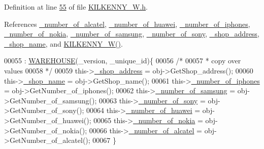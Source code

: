 Definition at line \hyperlink{_k_i_l_k_e_n_n_y___w_8h_source_l00055}{55} of file \hyperlink{_k_i_l_k_e_n_n_y___w_8h_source}{K\+I\+L\+K\+E\+N\+N\+Y\+\_\+\+W.\+h}.



References \hyperlink{_k_i_l_k_e_n_n_y___w_8h_source_l00116}{\+\_\+number\+\_\+of\+\_\+alcatel}, \hyperlink{_k_i_l_k_e_n_n_y___w_8h_source_l00114}{\+\_\+number\+\_\+of\+\_\+huawei}, \hyperlink{_k_i_l_k_e_n_n_y___w_8h_source_l00111}{\+\_\+number\+\_\+of\+\_\+iphones}, \hyperlink{_k_i_l_k_e_n_n_y___w_8h_source_l00115}{\+\_\+number\+\_\+of\+\_\+nokia}, \hyperlink{_k_i_l_k_e_n_n_y___w_8h_source_l00112}{\+\_\+number\+\_\+of\+\_\+samsung}, \hyperlink{_k_i_l_k_e_n_n_y___w_8h_source_l00113}{\+\_\+number\+\_\+of\+\_\+sony}, \hyperlink{_k_i_l_k_e_n_n_y___w_8h_source_l00109}{\+\_\+shop\+\_\+address}, \hyperlink{_k_i_l_k_e_n_n_y___w_8h_source_l00110}{\+\_\+shop\+\_\+name}, and \hyperlink{_k_i_l_k_e_n_n_y___w_8h_source_l00024}{K\+I\+L\+K\+E\+N\+N\+Y\+\_\+\+W()}.


\begin{DoxyCode}
00055                                                                           : 
      \hyperlink{class_w_a_r_e_h_o_u_s_e_a7a924d389af91f54ed0e1d1d8d56ec57_a7a924d389af91f54ed0e1d1d8d56ec57}{WAREHOUSE}(\_version, \_unique\_id)\{
00056         \textcolor{comment}{/*}
00057 \textcolor{comment}{         * copy over values
}
00058 \textcolor{comment}{         */}
00059         this->\hyperlink{class_k_i_l_k_e_n_n_y___w_a278c416a60d21ee6ffa400f6d1348fd5_a278c416a60d21ee6ffa400f6d1348fd5}{\_shop\_address} = obj->GetShop\_address();
00060         this->\hyperlink{class_k_i_l_k_e_n_n_y___w_a3ca31fe82131bef3b13759e6d8b9a83b_a3ca31fe82131bef3b13759e6d8b9a83b}{\_shop\_name} = obj->GetShop\_name();
00061         this->\hyperlink{class_k_i_l_k_e_n_n_y___w_a91935316f3da1d18589f7d02ec0ac24c_a91935316f3da1d18589f7d02ec0ac24c}{\_number\_of\_iphones} = obj->GetNumber\_of\_iphones();
00062         this->\hyperlink{class_k_i_l_k_e_n_n_y___w_abf89dc9f1d933e77c3597d2835c692a0_abf89dc9f1d933e77c3597d2835c692a0}{\_number\_of\_samsung} = obj->GetNumber\_of\_samsung();
00063         this->\hyperlink{class_k_i_l_k_e_n_n_y___w_a9b12aacf712ccf9e082daf450bbfbe8d_a9b12aacf712ccf9e082daf450bbfbe8d}{\_number\_of\_sony} = obj->GetNumber\_of\_sony();
00064         this->\hyperlink{class_k_i_l_k_e_n_n_y___w_a5aedbf8c3815df0d35a94ed9105f6574_a5aedbf8c3815df0d35a94ed9105f6574}{\_number\_of\_huawei} = obj->GetNumber\_of\_huawei();
00065         this->\hyperlink{class_k_i_l_k_e_n_n_y___w_a717b79aedec8f4f76269fc0e83bcd2eb_a717b79aedec8f4f76269fc0e83bcd2eb}{\_number\_of\_nokia} = obj->GetNumber\_of\_nokia();
00066         this->\hyperlink{class_k_i_l_k_e_n_n_y___w_ab1523ca2daf22c518edb3be585485b16_ab1523ca2daf22c518edb3be585485b16}{\_number\_of\_alcatel} = obj->GetNumber\_of\_alcatel();
00067     \}
\end{DoxyCode}


